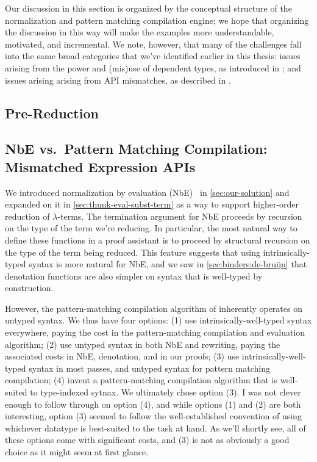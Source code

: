 Our discussion in this section is organized by the conceptual structure of the normalization and pattern matching compilation engine;
we hope that organizing the discussion in this way will make the examples more understandable, motivated, and incremental.
We note, however, that many of the challenges fall into the same broad categories that we've identified earlier in this thesis:
issues arising from the power and (mis)use of dependent types, as introduced in ;
and issues arising arising from API mismatches, as described in .

\subsection{Pre-Reduction}\label{sec:rewriting-more:pre-reduction}

\subsection{NbE vs.~Pattern Matching Compilation: Mismatched Expression APIs}\label{sec:rewriting-more:AST:choices}
We introduced normalization by evaluation (NbE)~\cite{NbE} in \autoref{sec:our-solution} and expanded on it in \autoref{sec:thunk-eval-subst-term} as a way to support higher-order reduction of $\lambda$-terms.
The termination argument for NbE proceeds by recursion on the type of the term we're reducing.
In particular, the most natural way to define these functions in a proof assistant is to proceed by structural recursion on the type of the term being reduced.
This feature suggests that using intrinsically-typed syntax is more natural for NbE, and we saw in \autoref{sec:binders:de-bruijn} that denotation functions are also simpler on syntax that is well-typed by construction.

However, the pattern-matching compilation algorithm of \textcite{maranget2008compiling} inherently operates on untyped syntax.
We thus have four options:
(1) use intrinsically-well-typed syntax everywhere, paying the cost in the pattern-matching compilation and evaluation algorithm;
(2) use untyped syntax in both NbE and rewriting, paying the associated costs in NbE, denotation, and in our proofs;
(3) use intrinsically-well-typed syntax in most passes, and untyped syntax for pattern matching compilation;
(4) invent a pattern-matching compilation algorithm that is well-suited to type-indexed sytnax.
We ultimately chose option (3).
I was not clever enough to follow through on option (4), and while options (1) and (2) are both interesting, option (3) seemed to follow the well-established convention of using whichever datatype is best-suited to the task at hand.
As we'll shortly see, all of these options come with significant costs, and (3) is not as obviously a good choice as it might seem at first glance.


